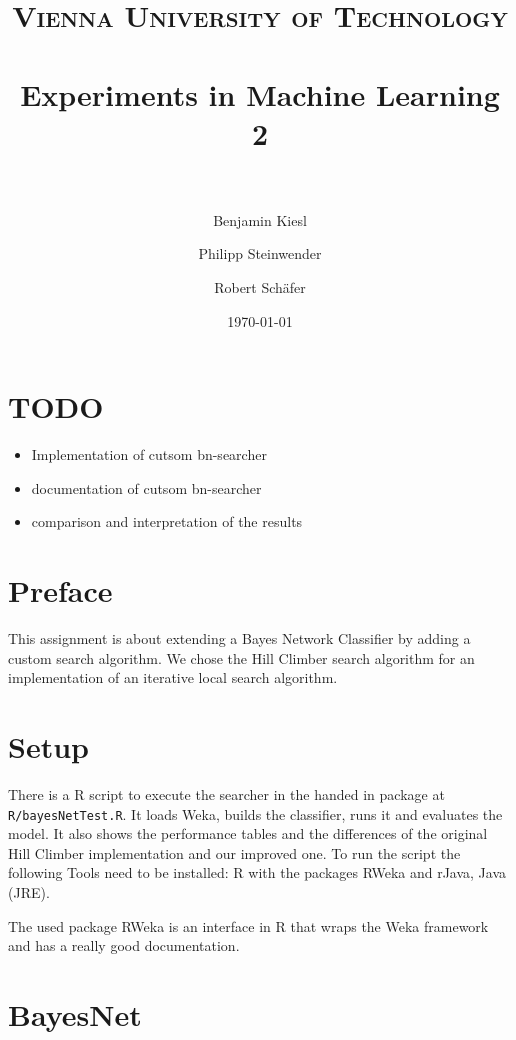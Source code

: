 \documentclass[paper=a4, fontsize=11pt]{scrartcl} %
\title{ 
\normalfont \normalsize 
\textsc{Vienna University of Technology} \\ [25pt] %
\horrule{0.5pt} \\[0.4cm] %
\huge Experiments in Machine Learning 2 \\ %
\horrule{2pt} \\[0.5cm] %
}
\author{Benjamin Kiesl \and Philipp Steinwender \and Robert Sch\"{a}fer} %
\date{\normalsize\today} %
\numberwithin{equation}{section} %
\numberwithin{figure}{section} %
\numberwithin{table}{section} %
\begin{document}
\maketitle %


\tableofcontents

%
%
%
\section{TODO}

\begin{itemize}
\item Implementation of cutsom bn-searcher
\item documentation of cutsom bn-searcher
\item comparison and interpretation of the results
\end{itemize}

%
%
%
\section{Preface}

This assignment is about extending a Bayes Network Classifier by adding a custom search algorithm. We chose the Hill Climber search algorithm for an implementation of an iterative local search algorithm.

%
%
%
\section{Setup}

There is a R script to execute the searcher in the handed in package at \texttt{R/bayesNetTest.R}. It loads Weka, builds the classifier, runs it and evaluates the model. It also shows the performance tables and the differences of the original Hill Climber implementation and our improved one. To run the script the following Tools need to be installed: R with the packages RWeka and rJava, Java (JRE).

The used package RWeka is an interface in R that wraps the Weka framework and has a really good documentation.

%
%
\section{BayesNet}
\end{document}
